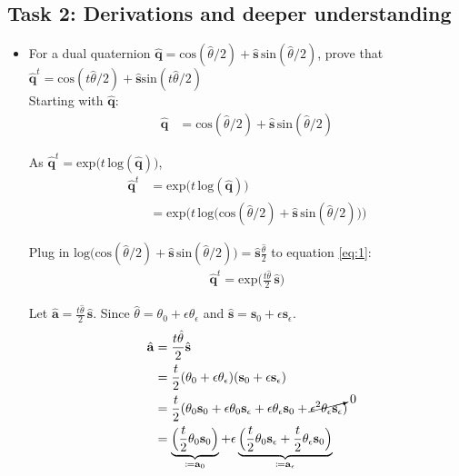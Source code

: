 \documentclass[paper=a4, fontsize=11pt]{scrartcl} %
\numberwithin{equation}{section} %
\numberwithin{figure}{section} %
\numberwithin{table}{section} %
\renewcommand{\vec}[1]{\mathbf{#1}}
\begin{document}
\subsection{Task 2: Derivations and deeper understanding}

\begin{itemize}
	\item For a dual quaternion $\hat{\vec{q}} = \text{cos} (\hat{\theta} /2) + \hat{\vec{s}} \, \text{sin} (\hat{\theta} /2)$, prove that $\hat{\vec{q}}^t = \text{cos} (t\hat{\theta} /2) + \hat{\vec{s}} \text{sin} (t\hat{\theta} /2)$ \\
	
	Starting with $\hat{\vec{q}}$:
	\begin{align}
		\hat{\vec{q}} &= \text{cos} (\hat{\theta} /2) + \hat{\vec{s}} \,\text{sin} (\hat{\theta} /2)
	\end{align}

	As $\hat{\vec{q}}^t	= \text{exp} \big(t \, \text{log}(\hat{\vec{q}}) \big)$, 
	\begin{align}
		\hat{\vec{q}}^t	&= \text{exp} \big( t \, \text{log}(\hat{\vec{q}}) \big) \\
						&= \text{exp}\Big(t \, \text{log} \big(\text{cos} (\hat{\theta} /2) + \hat{\vec{s}} \,\text{sin} (\hat{\theta} /2) \big) \Big)	\label{eq:1}
	\end{align}

	Plug in $\text{log} \big(\text{cos} (\hat{\theta} /2) + \hat{\vec{s}} \,\text{sin} (\hat{\theta} /2) \big) = \hat{\vec{s}} \frac{\hat{\theta}}{2}$ to equation \ref{eq:1}:
	\begin{align}
		\hat{\vec{q}}^t = \text{exp}\Big( \frac{t\hat{\theta}}{2} \,\hat{\vec{s}} \Big) \label{eq:qhattothet}
	\end{align}
	
	Let $\hat{\vec{a}} = \frac{t\hat{\theta}}{2} \,\hat{\vec{s}}$. Since $\hat{\theta} = \theta_0 + \epsilon \theta_\epsilon$ and $\hat{\vec{s}} = \vec{s}_0 + \epsilon\vec{s}_\epsilon$.
	\begin{align}
		\hat{\vec{a}} &= \frac{t\hat{\theta}}{2} \hat{\vec{s}} \\
		&= \frac{t}{2}(\theta_0 + \epsilon \theta_\epsilon)(\vec{s}_0 + \epsilon\vec{s}_\epsilon) \\
		&= \frac{t}{2} (\theta_0\vec{s}_0 + \epsilon \theta_0 \vec{s}_\epsilon + \epsilon \theta_\epsilon \vec{s}_0 + \cancelto{0}{\epsilon^2 \theta_\epsilon \vec{s}_\epsilon}) \\
		&= \underbrace{ \Big( \frac{t}{2} \theta_0\vec{s}_0 \Big) }_{\coloneqq \vec{a}_0} 
			+ \epsilon \underbrace{ \Big( \frac{t}{2} \theta_0 \vec{s}_\epsilon + \frac{t}{2} \theta_\epsilon \vec{s}_0 \Big) }_{\coloneqq \vec{a}_\epsilon }
	\end{align}
	

\end{itemize}
\end{document}
